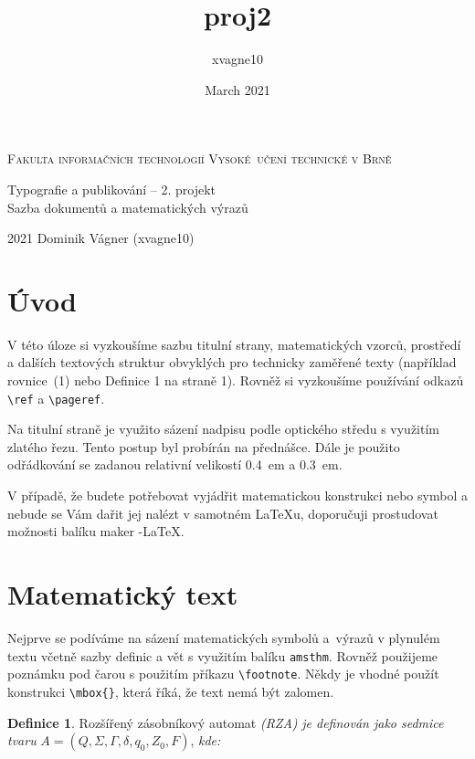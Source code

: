 \documentclass[a4paper, 11pt, twocolumn]{article}
\title{proj2}
\author{xvagne10}
\date{March 2021}
\theoremstyle{definition}
\newtheorem{definition}{Definice}
\begin{document}
\begin{titlepage}

\begin{center}
\Huge
\textsc{Fakulta informačních technologií Vysoké~učení technické v Brně} \\

\LARGE
Typografie a publikování -- 2. projekt \\
Sazba dokumentů a matematických výrazů \\
\end{center}

\Large 2021 \hfill Dominik Vágner (xvagne10)

\end{titlepage}

\newpage{}

\section*{Úvod}
V této úloze si vyzkoušíme sazbu titulní strany, matematických vzorců, prostředí a dalších textových struktur obvyklých pro technicky zaměřené texty (například rovnice~(1) nebo Definice 1 na straně 1). Rovněž si
vyzkoušíme používání odkazů \verb$\ref$ a \verb$\pageref$.

Na titulní straně je využito sázení nadpisu podle optického středu s využitím zlatého řezu. Tento postup byl probírán na přednášce. Dále je použito odřádkování se zadanou relativní velikostí 0.4~em a 0.3~em.

V případě, že budete potřebovat vyjádřit matematickou konstrukci nebo symbol a nebude se Vám dařit jej nalézt v samotném \LaTeX u, doporučuji prostudovat možnosti balíku maker \AmS-\LaTeX.

\section{Matematický text}
Nejprve se podíváme na sázení matematických symbolů a~výrazů v plynulém textu včetně sazby definic a vět s využitím balíku \verb$amsthm$. Rovněž použijeme poznámku pod čarou s použitím příkazu \verb$\footnote$. Někdy je vhodné použít konstrukci \verb$\mbox{}$, která říká, že text nemá být zalomen.

\begin{definition} \label{def1}
Rozšířený zásobníkový automat \emph{(RZA)} \emph{je definován jako sedmice tvaru} $A=\left(Q, \Sigma, \Gamma, \delta, q_{0}, Z_{0}, F\right)$, \emph{kde:}
\end{definition} 
\end{document}
